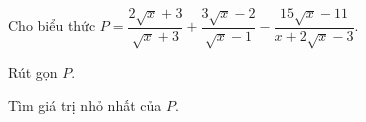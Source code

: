 \begin{bt}%
	Cho biểu thức $P =\dfrac{2\sqrt{x} + 3}{\sqrt{x} + 3} + \dfrac{3\sqrt{x} - 2}{\sqrt{x} - 1} - \dfrac{15\sqrt{x} - 11}{x + 2\sqrt{x} - 3}$.	
	\begin{listEX}[2]
	\item Rút gọn $P$.
	\item Tìm giá trị nhỏ nhất của $P$.
	\end{listEX}	
\end{bt}
